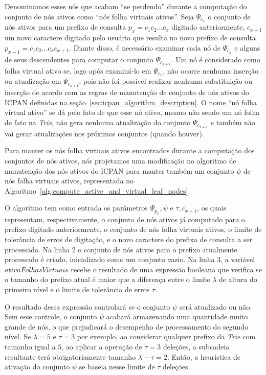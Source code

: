 Denominamos esses nós que acabam ``se perdendo'' durante a computação do conjunto de nós ativos como ``nós folha virtuais ativos''. Seja $\Psi_{c_{x}}$ o conjunto de nós ativos para um prefixo de consulta $p_{x} = c_1c_2...c_{x}$ digitado anteriormente, $c_{x+1}$ um novo caractere digitado pelo usuário que resulta no novo prefixo de consulta $p_{x+1} = c_1c_2...c_{x}c_{x + 1}$. Diante disso, é necessário examinar cada nó de $\Psi_{c_{x}}$ e alguns de seus descendentes para computar o conjunto $\Psi_{c_{x + 1}}$. Um nó é considerado como folha virtual ativo se, logo após examiná-lo em $\Psi_{c_{x}}$, não ocorre nenhuma inserção ou atualização em $\Psi_{c_{x + 1}}$, pois não foi possível realizar nenhuma substituição ou inserção de acordo com as regras de manutenção de conjunto de nós ativos do ICPAN definidas na seção~\ref{sec:icpan_algorithm_description}. O nome ``nó folha virtual ativo'' se dá pelo fato de que esse nó ativo, mesmo não sendo um nó folha de fato na \textit{Trie}, não gera nenhuma atualização do conjunto $\Psi_{c_{x + 1}}$ e também não vai gerar atualizações nos próximos conjuntos (quando houver).

Para manter os nós folha virtuais ativos encontrados durante a computação dos conjuntos de nós ativos, nós projetamos uma modificação no algoritmo de manutenção dos nós ativos do ICPAN para manter também um conjunto $\psi$ de nós folha virtuais ativos, representada no Algoritmo~\ref{alg:compute_active_and_virtual_leaf_nodes}.

O algoritmo tem como entrada os parâmetros $\Psi_{p_x}, \psi$ e $\tau, c_{x+1}$, os quais representam, respectivamente, o conjunto de nós ativos já computado para o prefixo digitado anteriormente, o conjunto de nós folha virtuais ativos, o limite de tolerância de erros de digitação, e o novo caractere do prefixo de consulta a ser processado. Na linha 2 o conjunto de nós ativos para o prefixo atualmente processado é criado, inicializado como um conjunto vazio. Na linha 3, a variável $ativaFolhasVirtuais$ recebe o resultado de uma expressão booleana que verifica se o tamanho do prefixo atual é maior que a diferença entre o limite $\lambda$ de altura do primeiro nível e o limite de tolerância de erros $\tau$. 

O resultado dessa expressão controlará se o conjunto $\psi$ será atualizado ou não. Sem esse controle, o conjunto $\psi$ acabará armazenando uma quantidade muito grande de nós, o que prejudicará o desempenho de processamento do segundo nível. Se $\lambda = 5$ e $\tau = 3$ por exemplo, ao considerar qualquer prefixo da \textit{Trie} com tamanho igual a $5$, ao aplicar a operação de $\tau = 3$ deleções, a subcadeia resultante terá obrigatoriamente tamanho $\lambda - \tau = 2$. Então, a heurística de ativação do conjunto $\psi$ se baseia nesse limite de $\tau$ deleções. 

